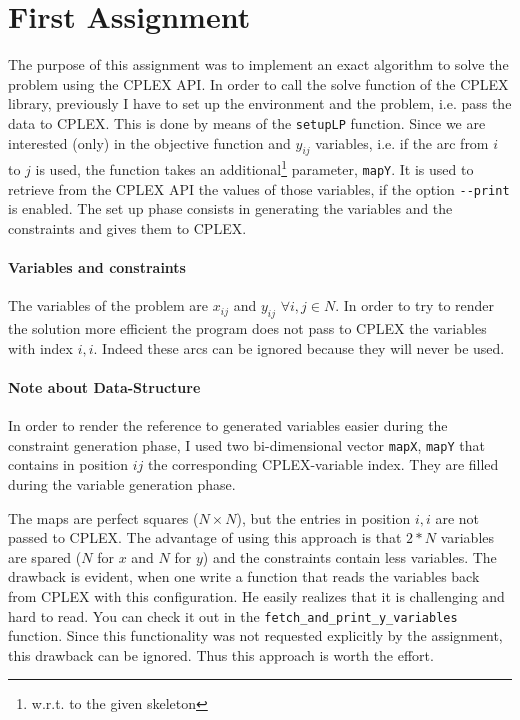 \section{First Assignment}
The purpose of this assignment was to implement an exact algorithm to solve the problem using the CPLEX API.
In order to call the solve function of the CPLEX library, previously I have to set up the environment
and the problem, i.e. pass the data to CPLEX. This is done by means of the \verb|setupLP| function.
Since we are interested (only) in the objective function and $y_{ij}$ variables, i.e. if the arc from $i$
to $j$ is used, the function takes
an additional\footnote{w.r.t. to the given skeleton} parameter,  \verb|mapY|. It is used to
retrieve from the CPLEX API the values of those variables, if the option  \verb|--print| is enabled.
The set up phase consists in generating the variables and the constraints and gives them to CPLEX.

\paragraph{ Variables and constraints}
The variables of the problem are $x_{ij}$ and $y_{ij}$ $\forall i,j \in N$.
In order to try to render the solution more efficient the program does not pass
to CPLEX the variables with index $i,i$. Indeed these arcs can be ignored because
they will never be used.



\paragraph{Note about Data-Structure} In order to render the reference to generated variables easier
during the constraint generation phase, I used two bi-dimensional vector \verb|mapX|, \verb|mapY| that contains in position $ij$ 
the corresponding CPLEX-variable index. They are filled during the variable generation phase.

The maps are perfect squares ($N\times N$), but the entries in position $i,i$ are not passed to CPLEX.
The advantage of using this approach is that $2*N$ variables are spared ($N$ for $x$ and $N$ for $y$) and the constraints
contain less variables.
The drawback is evident, when one write a function that reads the variables back from CPLEX with this configuration. He easily realizes
that it is challenging and hard to read.
You can check it out in the \verb|fetch_and_print_y_variables| function.
Since this functionality was not requested explicitly by the assignment,
this drawback can be ignored. Thus this approach is worth the effort.



